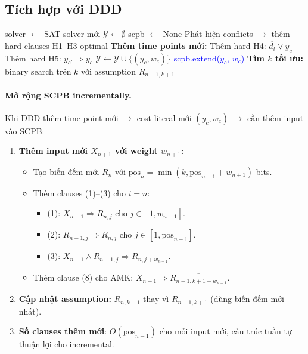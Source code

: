 \documentclass[11pt,a4paper]{article}
\begin{document}
\subsection{Tích hợp với DDD}

\begin{algorithm}[H]
\caption{DDD + SAT + SCPB (thay thế RC2)}
\begin{algorithmic}[1]
\State solver $\gets$ SAT solver mới
\State $\mathcal{Y} \gets \emptyset$ 
\State scpb $\gets$ None
\Loop {}
    \State Phát hiện conflicts $\to$ thêm hard clauses H1--H3
     \Return optimal \EndIf
  \EndIf
  \State \textbf{Thêm time points mới:}
    \State Thêm hard H4: $\overline{d_t} \vee y_c$
    \State Thêm hard H5: $y_{c'} \Rightarrow y_c$
      \State $\mathcal{Y} \gets \mathcal{Y} \cup \{(y_c, w_c)\}$
      \State \textcolor{blue}{scpb.extend($y_c$, $w_c$)} 
    \EndIf
  \EndFor
  \State \textbf{Tìm $k$ tối ưu:} binary search trên $k$ với assumption $\overline{R_{n-1,k+1}}$
\EndLoop
\end{algorithmic}
\end{algorithm}

\paragraph{Mở rộng SCPB incrementally.} Khi DDD thêm time point mới $\to$ cost literal mới $(y_c, w_c)$ $\to$ cần thêm input vào SCPB:

\begin{enumerate}
  \item \textbf{Thêm input mới $X_{n+1}$ với weight $w_{n+1}$:}
  \begin{itemize}
    \item Tạo biến đếm mới $R_n$ với $\text{pos}_n = \min(k, \text{pos}_{n-1} + w_{n+1})$ bits.
    \item Thêm clauses (1)--(3) cho $i = n$:
    \begin{itemize}
      \item (1): $X_{n+1} \Rightarrow R_{n,j}$ cho $j \in [1, w_{n+1}]$.
      \item (2): $R_{n-1,j} \Rightarrow R_{n,j}$ cho $j \in [1, \text{pos}_{n-1}]$.
      \item (3): $X_{n+1} \wedge R_{n-1,j} \Rightarrow R_{n,j+w_{n+1}}$.
    \end{itemize}
    \item Thêm clause (8) cho AMK: $X_{n+1} \Rightarrow \overline{R_{n-1,k+1-w_{n+1}}}$.
  \end{itemize}

  \item \textbf{Cập nhật assumption:} $\overline{R_{n,k+1}}$ thay vì $\overline{R_{n-1,k+1}}$ (dùng biến đếm mới nhất).

  \item \textbf{Số clauses thêm mới}: $O(\text{pos}_{n-1})$ cho mỗi input mới, cấu trúc tuần tự thuận lợi cho incremental.
\end{enumerate}
\end{document}
